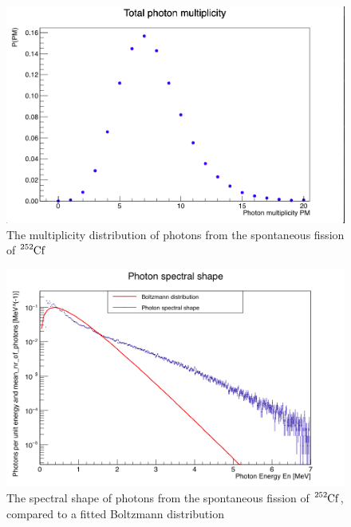 \documentclass[]{article}
\begin{document}
\begin{figure} [H]
	\centering
	\includegraphics[scale=0.36]{Cf252_sf_total_ph_mult.png}
	\caption{The multiplicity distribution of photons from the spontaneous fission of $\ce{^{252}Cf}$}
	\label{fig:Cf252_sf_total_ph_mult}
\end{figure}

\begin{figure} [H]
	\centering
	\includegraphics[scale=0.36]{Cf252_sf_photons_spectral_shape.png}
	\caption{The spectral shape of photons from the spontaneous fission of $\ce{^{252}Cf}$, compared to a fitted Boltzmann distribution}
	\label{fig:Cf252_sf_photons_spectral_shape}
\end{figure}
	
\end{document}
